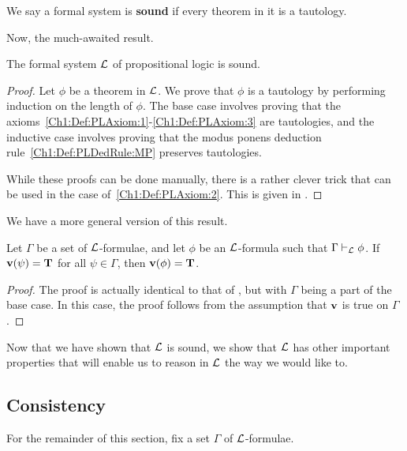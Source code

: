 \begin{boxdefinition}[Soundness]
    We say a formal system is \textbf{sound} if every theorem in it is a tautology.
\end{boxdefinition}

Now, the much-awaited result.

\begin{boxtheorem}[Soundness of $\L$]\label{Ch1:Thm:LSoundness}
    The formal system $\L$ of propositional logic is sound.
\end{boxtheorem}
\begin{proof}
    Let $\phi$ be a theorem in $\L$. We prove that $\phi$ is a tautology by performing induction on the length of $\phi$. The base case involves proving that the axioms~\ref{Ch1:Def:PLAxiom:1}-\ref{Ch1:Def:PLAxiom:3} are tautologies, and the inductive case involves proving that the modus ponens deduction rule~\ref{Ch1:Def:PLDedRule:MP} preserves tautologies.

    While these proofs can be done manually, there is a rather clever trick that can be used in the case of~\ref{Ch1:Def:PLAxiom:2}. This is given in \cite[Proof of 1.3.1]{2018LecNotes}. \sorry %
\end{proof}

We have a more general version of this result.

\begin{boxtheorem}
    Let $\Gamma$ be a set of $\L$-formulae, and let $\phi$ be an $\L$-formula such that $\Gamma \vdash_{\mathcal{L}} \phi$. If $\mathbf{v}\!\left( \psi \right) = \mathbf{T}$ for all $\psi \in \Gamma$, then $\mathbf{v}\!\left( \phi \right) = \mathbf{T}$.
\end{boxtheorem}
\begin{proof}
    The proof is actually identical to that of , but with $\Gamma$ being a part of the base case. In this case, the proof follows from the assumption that $\mathbf{v}$ is true on $\Gamma$.
\end{proof}

Now that we have shown that $\L$ is sound, we show that $\L$ has other important properties that will enable us to reason in $\L$ the way we would like to.

\subsection{Consistency}

For the remainder of this section, fix a set $\Gamma$ of $\L$-formulae.

